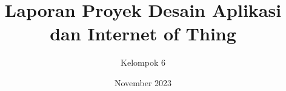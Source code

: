 \documentclass[a4paper,12pt]{article}
\begin{document}
\title{Laporan Proyek Desain Aplikasi dan Internet of Thing}
\author{Kelompok 6}
\date{November 2023}

    
    \newpage
    
    \newpage
    
    \newpage
    
    \newpage
    
    \newpage
    
    \newpage
    
    
    \newpage
    
\end{document}
